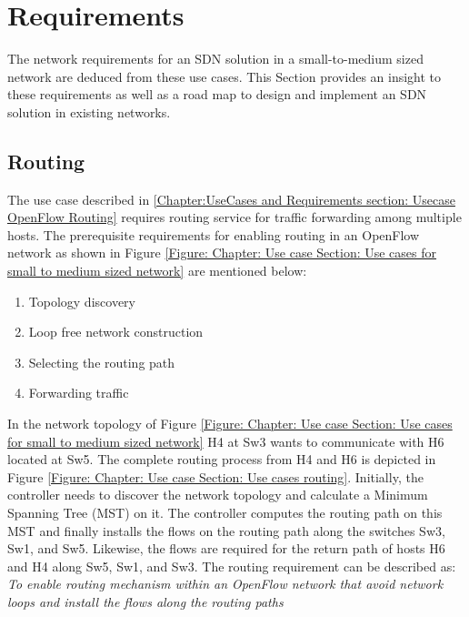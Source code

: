 

\section{Requirements}
\label{Chapter: Use cases and Requirements:Section:Requirements of Use Cases}

The network requirements for an SDN solution in a small-to-medium sized network are deduced from these use cases. This Section provides an insight to these requirements as well as a road map to design and implement an SDN solution in existing networks.

\subsection{Routing}
\label{Chapter: Use cases and Requirements:Section: Routing Requirements}

The use case described in \ref{Chapter:UseCases and Requirements section: Usecase OpenFlow Routing} requires routing service for traffic forwarding  among multiple hosts. The prerequisite requirements for enabling routing in an OpenFlow network as shown in Figure \ref{Figure: Chapter: Use case Section: Use cases for small to medium sized network} are mentioned below:

\begin{enumerate}
	\item Topology discovery 
	\item Loop free network construction
	\item Selecting the routing path
	\item Forwarding traffic	
\end{enumerate}

In the network topology of Figure \ref{Figure: Chapter: Use case Section: Use cases for small to medium sized network} H4 at Sw3 wants to communicate with H6 located at Sw5. The complete routing process from H4 and H6 is depicted in Figure \ref{Figure: Chapter: Use case Section: Use cases routing}. Initially, the controller needs to discover the network topology and calculate a Minimum Spanning Tree (MST) on it. The controller computes the routing path on this MST and finally installs the flows on the routing path along the switches Sw3, Sw1, and Sw5. Likewise, the flows are required for the return path of hosts H6 and H4 along Sw5, Sw1, and Sw3.  The routing requirement can be described as: \textit{To enable routing mechanism within an OpenFlow network that avoid network loops and install the flows along the routing paths}

